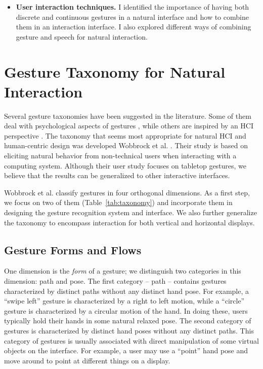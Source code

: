 \begin{itemize}
  \item \textbf{User interaction techniques.} I identified the importance of
  having both discrete and continuous gestures in a natural interface and how to
  combine them in an interaction interface. I also explored different ways of
  combining gesture and speech for natural interaction.
\end{itemize}

\section{Gesture Taxonomy for Natural Interaction}\label{sec:taxonomy}
Several gesture taxonomies have been suggested in the literature. Some of them
deal with psychological aspects of gestures \cite{kendon86, mcneill82}, while
others are inspired by an HCI perspective \cite{quek94,
quek95, Pavlovic97}. The taxonomy that seems most appropriate for natural HCI
and human-centric design was developed Wobbrock et al. \cite{wobbrock09}. Their
study is based on eliciting natural behavior from non-technical users when
interacting with a computing system. Although their user study focuses on
tabletop gestures, we believe that the results can be generalized to other
interactive interfaces. 

Wobbrock et al. classify gestures in four orthogonal dimensions. As a first
step, we focus on two of them (Table~\ref{tab:taxonomy}) and incorporate them in
designing the gesture recognition system and interface. We also further generalize the
taxonomy to encompass interaction for both vertical and horizontal displays.

\subsection{Gesture Forms and Flows}
One dimension is the \textit{form} of a gesture; we distinguish two
categories in this dimension: path and pose. The first category -- path --
contains gestures characterized by distinct paths without any distinct
hand pose. For example, a ``swipe left'' gesture is characterized by a
right to left motion, while a ``circle'' gesture is characterized by a
circular motion of the hand. In doing these, users typically hold their
hands in some natural relaxed pose. The second category of gestures is
characterized by distinct hand poses without any distinct paths. This category
of gestures is usually associated with direct manipulation of some virtual
objects on the interface.
For example, a user may use a ``point'' hand pose and move around to
point at different things on a display.

